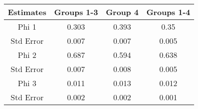 \begin{tabular}{cccc}
\hline
Estimates & Groups 1-3 & Group 4 & Groups 1-4 \\
\hline
Phi 1 & 0.303 & 0.393 & 0.35 \\
Std Error & 0.007 & 0.007 & 0.005 \\
Phi 2 & 0.687 & 0.594 & 0.638 \\
Std Error & 0.007 & 0.008 & 0.005 \\
Phi 3 & 0.011 & 0.013 & 0.012 \\
Std Error & 0.002 & 0.002 & 0.001 \\
\hline
\end{tabular}
